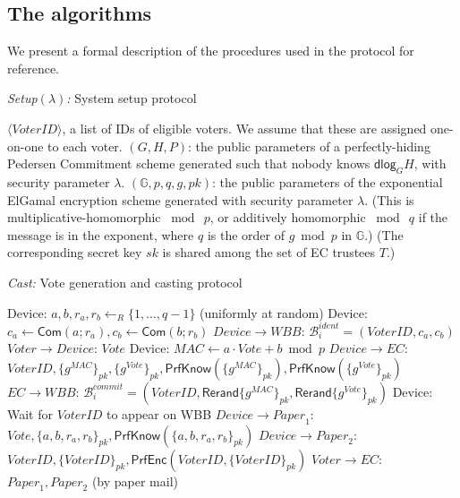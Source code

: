 \documentclass[12pt,a4paper]{article}
\newcommand{\commit}{\mathsf{Com}}
\newcommand{\PrfEnc}{\mathsf{PrfEnc}}
\newcommand{\PrfKnow}{\mathsf{PrfKnow}}
\newcommand{\rerand}{\mathsf{Rerand}}
\newcommand{\dlog}{\mathsf{dlog}}
\theoremstyle{definition}
\newcommand{\Vote}{\mathit{Vote}}
\newcommand{\VoterID}{\mathit{VoterID}}
\newcommand{\Paper}{\mathit{Paper}}
\newcommand{\Mac}{\mathit{MAC}}
\newcommand{\Wbb}{\mathit{WBB}}
\newcounter{protocol}
\begin{document}
\subsection{The algorithms}\label{app-algorithms}
We present a formal description of the procedures used in the protocol for reference.
\singlespacing
\begin{algorithm} 	\caption{\textit{Setup}$(\lambda)$\textit{:} System setup protocol}
	\begin{algorithmic}[1]
\State $\langle \VoterID \rangle$, a list of IDs of eligible voters.  We assume that these are assigned one-on-one to each voter.
\State	$(G,H,P)$: the public parameters of a perfectly-hiding Pedersen Commitment scheme  generated such that nobody knows $\dlog_G H$, with security parameter $\lambda$.
\State $(\mathbb{G}, p, q, g, pk)$: the public parameters of the exponential ElGamal encryption scheme generated with security parameter $\lambda$.
(This is multiplicative-homomorphic $\bmod\ p$, or additively homomorphic $\bmod\ q$ if the message is in the exponent, where $q$ is the order of $g\bmod p$ in $\mathbb{G}$.)
\State  (The corresponding secret key  $sk$ is shared among the set of EC trustees $T$.)
\end{algorithmic}
	\label{fig:setup}
\end{algorithm}
\begin{algorithm} 	\caption{\textit{Cast:} Vote generation and casting protocol}
	\begin{algorithmic}[1]
	\State Device: $a,b,r_a,r_b\leftarrow_R\{1,\ldots,q-1\}$ (uniformly at random)
	\State Device: $c_a\leftarrow\commit(a;r_a), c_b\leftarrow\commit(b;r_b)$
	\State $Device\rightarrow \Wbb$: $\mathcal{B}^{ident}_i=(\VoterID, c_a, c_b)$\label{Step:VoterCommit}
	\State $Voter\rightarrow Device$: $\Vote$
	\State Device: $\Mac\leftarrow a\cdot Vote+b\bmod p$
	\State $Device\rightarrow EC$: $\VoterID, \{g^\Mac\}_{pk}, \{g^\Vote\}_{pk}, \PrfKnow(\{g^\Mac\}_{pk}), \PrfKnow(\{g^\Vote\}_{pk})$%
	\State $EC\rightarrow \Wbb$: $\mathcal{B}^{commit}_i=(\VoterID, \rerand\{g^\Mac\}_{pk}, \rerand\{g^\Vote\}_{pk})$ \label{Step:ECPostsVoteMAC}
	\State Device: Wait for $\VoterID$ to appear on WBB
	\State $Device\rightarrow \Paper_1$: $\Vote, \{a,b,r_a,r_b\}_{pk}, \PrfKnow(\{a,b,r_a,r_b\}_{pk})$
	\State $Device\rightarrow \Paper_2$: $\VoterID, \{\VoterID\}_{pk}, \PrfEnc(\VoterID, \{\VoterID\}_{pk})$
	\State $Voter\rightarrow EC$: $\Paper_1, \Paper_2$ (by paper mail)
	\end{algorithmic}
\label{fig:genAndCasting}
\end{algorithm}
\end{document}

